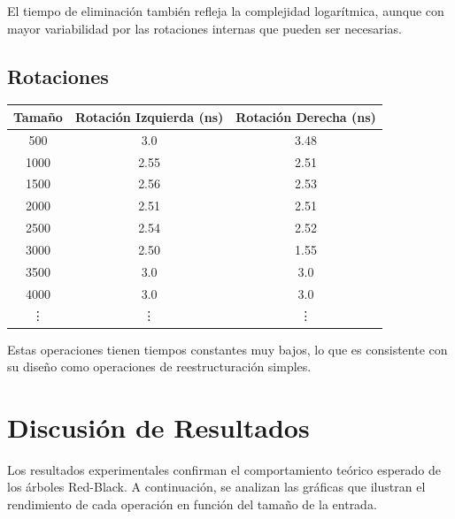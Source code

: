 \documentclass[conference]{IEEEtran}
\begin{document}
\vspace{1em}

El tiempo de eliminación también refleja la complejidad logarítmica, aunque con mayor variabilidad por las rotaciones internas que pueden ser necesarias.

\subsection{Rotaciones}


\vspace{0.5em}

\begin{center}
\begin{tabular}{ccc}
\toprule
\textbf{Tamaño} & \textbf{Rotación Izquierda (ns)} & \textbf{Rotación Derecha (ns)} \\
\midrule
500   & 3.0 & 3.48 \\
1000  & 2.55 & 2.51 \\
1500  & 2.56 & 2.53 \\
2000  & 2.51 & 2.51 \\
2500  & 2.54 & 2.52 \\
3000  & 2.50 & 1.55 \\
3500  & 3.0 & 3.0 \\
4000  & 3.0 & 3.0 \\
\vdots & \vdots & \vdots \\
\bottomrule
\end{tabular}
\end{center}

\vspace{1em}

Estas operaciones tienen tiempos constantes muy bajos, lo que es consistente con su diseño como operaciones de reestructuración simples.

\section{Discusión de Resultados}

Los resultados experimentales confirman el comportamiento teórico esperado de los árboles Red-Black. A continuación, se analizan las gráficas que ilustran el rendimiento de cada operación en función del tamaño de la entrada.
\end{document}
